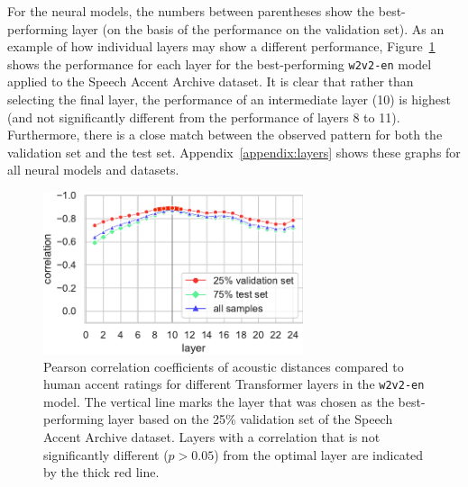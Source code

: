 \documentclass[11pt,a4paper]{article}
\begin{document}
For the neural models, the numbers between parentheses show the best-performing layer (on the basis of the performance on the validation set).
As an example of how individual layers may show a different performance, Figure~\ref{fig:wav2vecen} shows the performance for each layer for the best-performing \texttt{w2v2-en} model applied to the Speech Accent Archive dataset. It is clear that rather than selecting the final layer, the performance of an intermediate layer (10) is highest (and not significantly different from the performance of layers 8 to 11). Furthermore, there is a close match between the observed pattern for both the validation set and the test set. 
Appendix~\ref{appendix:layers} shows these graphs for all neural models and datasets. 

\begin{figure}[ht]
  \begin{center}
    \includegraphics[width=3in]{figures/SAA/wav2vec2-large-960h.pdf}
    \caption{Pearson correlation coefficients of acoustic distances compared to human accent ratings for different Transformer layers in the \texttt{w2v2-en} model. The vertical line marks the layer that was chosen as the best-performing layer based on the 25\% validation set of the Speech Accent Archive dataset. Layers with a correlation that is  not significantly different ($p > 0.05$) from the optimal layer are indicated by the thick red line.}
    \label{fig:wav2vecen}
  \end{center} 
\end{figure}





\end{document}
